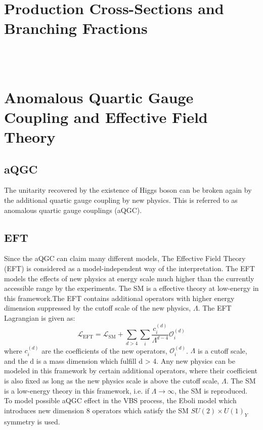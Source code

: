 \section{Production Cross-Sections and Branching Fractions}
\\
\\

\section{Anomalous Quartic Gauge Coupling and Effective Field Theory}

\subsection{aQGC}
The unitarity recovered by the existence of Higgs boson can be broken again by the additional quartic gauge coupling by new physics. This is referred to as anomalous quartic gauge couplings (aQGC). 

\subsection{EFT}
Since the aQGC can claim many different models, The Effective Field Theory (EFT) is considered as a model-independent way of the interpretation. The EFT models the effects of new physics at energy scale much higher than the currently accessible range by the experiments. The SM is a effective theory at low-energy in this framework.The EFT contains additional operators with higher energy dimension suppressed by the cutoff scale of the new physics, $\Lambda$.
The EFT Lagrangian is given as:
\begin{equation}
\mathcal{L}_{\mathrm{EFT}}=\mathcal{L}_{\mathrm{SM}}+\sum_{d>4} \sum_{i} \frac{c_{i}^{(d)}}{\Lambda^{d-4}} \mathcal{O}_{i}^{(d)}
\end{equation}
where $c_{i}^{(d)}$ are the coefficients of the new operators, $\mathcal{O}_{i}^{(d)}$.
$\Lambda$ is a cutoff scale, and the d is a mass dimension which fulfill d > 4.
Any new physics can be modeled in this framework by certain additional operators, where their coefficient is also fixed as long as the new physics scale is above the cutoff scale, $\Lambda$. The SM is a low-energy theory in this framework, i.e. if $\Lambda \rightarrow \infty$, the SM is reproduced.
\\

To model possible aQGC effect in the VBS process, the Eboli model \cite{eboli2006p} which introduces new dimension 8 operators which satisfy the SM $SU(2)\times U(1)_Y$ symmetry is used. 

